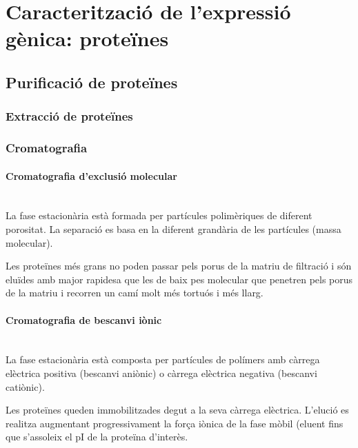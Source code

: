 
\section{Caracterització de l'expressió gènica: proteïnes}
\label{sec:caract-de-lexpr}

\subsection{Purificació de proteïnes}
\label{sec:purif-de-prot}

\subsubsection{Extracció de proteïnes}
\label{sec:extr-de-prot}


\subsubsection{Cromatografia}
\label{sec:cromatografia}

\paragraph{Cromatografia d'exclusió molecular} \hfill \\
La fase estacionària està formada per partícules polimèriques de diferent porositat. La separació es basa en la diferent grandària de les partícules (massa molecular).

Les proteïnes més grans no poden passar pels porus de la matriu de filtració i són eluïdes amb major rapidesa que les de baix pes molecular que penetren pels porus de la matriu i recorren un camí molt més tortuós i més llarg.

\paragraph{Cromatografia de bescanvi iònic} \hfill \\
 La fase estacionària està composta per partícules de polímers amb càrrega elèctrica positiva (bescanvi aniònic) o càrrega elèctrica negativa (bescanvi catiònic).

Les proteïnes queden immobilitzades degut a la seva càrrega elèctrica. L'elució es realitza augmentant progressivament la força iònica de la fase mòbil (eluent fins que s'assoleix el pI de la proteïna d'interès.


